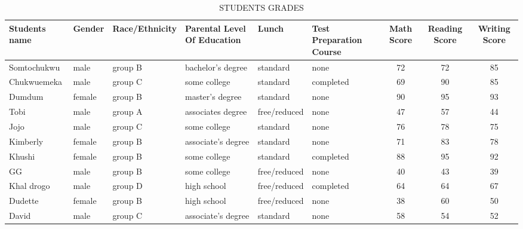 \documentclass{article}
\begin{document}
	\begin{sidewaystable}[h!]
	
		\begin{center}
			
				 
			\caption{STUDENTS GRADES}
			\label{tab:table1}
			
	    \begin{tabular}{|l|l|l|l|l|l|c|c|c|}
	    \hline
	    	\cellcolor{blue!50}\textbf{Students name} &\cellcolor{blue!50}\textbf{Gender} & \cellcolor{blue!50}\textbf{Race/Ethnicity} & \cellcolor{blue!50}\textbf{Parental Level Of Education} & \cellcolor{blue!50}\textbf{Lunch} & \cellcolor{blue!50}\textbf{Test Preparation Course}& \cellcolor{blue!50}\textbf{Math Score}&\cellcolor{blue!50}\textbf{Reading Score} &\cellcolor{blue!50}\textbf{Writing Score}\\
	    \hline
	    Somtochukwu&male&group B&bachelor's degree&standard&none&72&72&85\\
	    \hline
	    Chukwuemeka&male&group C&some college&standard&completed&69&90&85\\
	    \hline
	    Dumdum&female&group B&master's degree&standard&none&90&95&93\\
	    \hline
	    Tobi&male&group A&associates degree&free/reduced&none&47&57&44\\
	    \hline
	    Jojo&male&group C&some college&standard&none&76&78&75\\
	    \hline
	    Kimberly&female&group B&associate's degree&standard&none&71&83&78\\
	    \hline
	    Khushi&female&group B&some college&standard&completed&88&95&92\\
	    \hline
	    GG&male&group B&some college&free/reduced&none&40&43&39\\
	    \hline
	    Khal drogo&male&group D&high school&free/reduced&completed&64&64&67\\
	    \hline
	    Dudette&female&group B&high school&free/reduced&none&38&60&50\\
	    \hline
	    David&male&group C&associate's degree&standard&none&58&54&52\\
	    \hline
         \end{tabular}      
		\end{center}
		\end{sidewaystable}
      	
\end{document}
